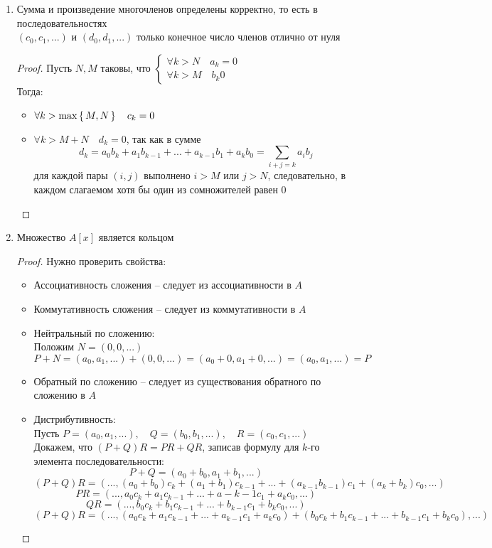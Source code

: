\begin{theorem}
	\hfill
	\begin{enumerate}
		\item Сумма и произведение многочленов определены корректно, то есть в последовательностях \\ $(c_0, c_1, ...)$ и $(d_0, d_1, ...)$ только конечное число членов отлично от нуля
		\begin{proof}
			Пусть $N, M$ таковы, что $
			\begin{cases}
				\forall k > N \quad a_k = 0 \\
				\forall k > M \quad b_k 0
			\end{cases} $ \\
			Тогда:
			\begin{itemize}
				\item $ \forall k > \max \set{M, N} \quad c_k = 0 $
				\item $\forall k > M + N \quad d_k = 0 $, так как в сумме
				$$ d_k = a_0b_k + a_1b_{k - 1} + ... + a_{k - 1}b_1 + a_kb_0 = \sum_{i + j = k}a_ib_j $$
				для каждой пары $(i, j)$ выполнено $i > M$ или $j > N$, следовательно, в каждом слагаемом хотя бы один из сомножителей равен 0
			\end{itemize}
		\end{proof}
		\item Множество $A[x]$ является кольцом
		\begin{proof}
			Нужно проверить свойства:
			\begin{itemize}
				\item Ассоциативность сложения -- следует из ассоциативности в $A$
				\item Коммутативность сложения -- следует из коммутативности в $A$
				\item Нейтральный по сложению: \\
				Положим $N = (0, 0, ...)$
				$$ P + N = (a_0, a_1, ...) + (0, 0, ...) = (a_0 + 0, a_1 + 0, ...) = (a_0, a_1, ...) = P $$
				\item Обратный по сложению -- следует из существования обратного по сложению в $A$
				\item Дистрибутивность: \\
				Пусть $P = (a_0, a_1, ...), \quad Q = (b_0, b_1, ...), \quad R = (c_0, c_1, ...)$ \\
				Докажем, что $(P + Q)R = PR + QR$, записав формулу для $k$-го элемента последовательности:
				$$ P + Q = (a_0 + b_0, a_1 + b_1, ...) $$
				$$ (P + Q)R = (..., (a_0 + b_0)c_k + (a_1 + b_1)c_{k - 1} + ... + (a_{k - 1}b_{k - 1})c_1 + (a_k + b_k)c_0, ...) $$
				$$ PR = (..., a_0c_k + a_1c_{k - 1} + ... + a-{k - 1}c_1 + a_kc_0, ...) $$
				$$ QR = (..., b_0c_k + b_1c_{k - 1} + ... + b_{k - 1}c_1 + b_kc_0, ...) $$
				$$ (P + Q)R = (..., (a_0c_k + a_1c_{k - 1} + ... + a_{k - 1}c_1 + a_kc_0) + (b_0c_k + b_1c_{k - 1} + ... + b_{k - 1}c_1 + b_kc_0), ...) $$
			\end{itemize}
		\end{proof}
	\end{enumerate}
\end{theorem}

